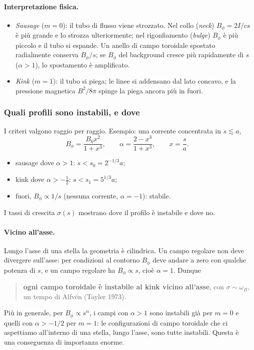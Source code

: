 \paragraph{Interpretazione fisica.}
\begin{itemize}
\item \emph{Sausage} ($m=0$): il tubo di flusso viene strozzato. Nel collo (\emph{neck}) $B_\phi=2I/cs$ è più grande e lo strozza ulteriormente; nel rigonfiamento (\emph{bulge}) $B_\phi$ è più piccolo e il tubo si espande. Un anello di campo toroidale spostato radialmente conserva $B_\phi/s$; se $B_\phi$ del background cresce più rapidamente di $s$ ($\alpha>1$), lo spostamento è amplificato.
\item \emph{Kink} ($m=1$): il tubo si piega; le linee si addensano dal lato concavo, e la pressione magnetica $B^2/8\pi$ spinge la piega ancora più in fuori.
\end{itemize}

\subsubsection{Quali profili sono instabili, e dove}

I criteri valgono raggio per raggio. Esempio: una corrente concentrata in $s\lesssim a$,
\begin{equation}
B_\phi=\frac{B_0x^2}{1+x^3},\qquad\alpha=\frac{2-x^3}{1+x^3},\qquad x=\frac sa .
\end{equation}
\begin{itemize}
\item sausage dove $\alpha>1$: $s<s_0=2^{-1/3}a$;
\item kink dove $\alpha>-\tfrac12$: $s<s_1=5^{1/3}a$;
\item fuori, $B_\phi\propto1/s$ (nessuna corrente, $\alpha=-1$): stabile.
\end{itemize}
I tassi di crescita $\sigma(s)$ mostrano dove il profilo è instabile e dove no.

\paragraph{Vicino all'asse.} Lungo l'asse di una stella la geometria è cilindrica. Un campo regolare non deve divergere sull'asse: per condizioni al contorno $B_\phi$ deve andare a zero con qualche potenza di $s$, e un campo regolare ha $B_\phi\propto s$, cioè $\alpha=1$. Dunque
\begin{quote}
\textbf{ogni campo toroidale è instabile al kink vicino all'asse}, con $\sigma\sim\omega_B$, un tempo di Alfvén (Tayler 1973).
\end{quote}
Più in generale, per $B_\phi\propto s^\alpha$, i campi con $\alpha>1$ sono instabili già per $m=0$ e quelli con $\alpha>-1/2$ per $m=1$: le configurazioni di campo toroidale che ci aspettiamo all'interno di una stella, lungo l'asse, sono tutte instabili. Questa è una conseguenza di importanza enorme.

